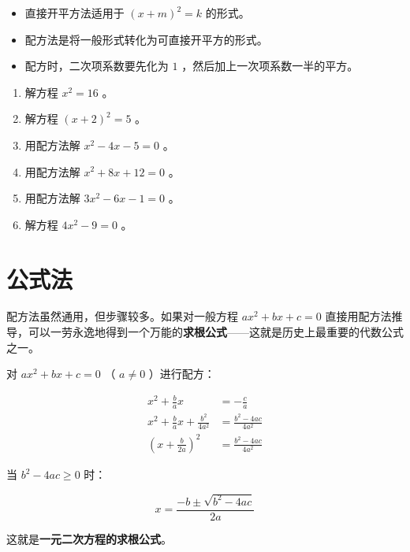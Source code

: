 \begin{keytakeaway}


\begin{itemize}
  \item 直接开平方法适用于 $(x + m)^2 = k$ 的形式。
  \item 配方法是将一般形式转化为可直接开平方的形式。
  \item 配方时，二次项系数要先化为 $1$ ，然后加上一次项系数一半的平方。
\end{itemize}


\end{keytakeaway}

\begin{practice}


\begin{enumerate}
  \item 解方程 $x^2 = 16$ 。
  \item 解方程 $(x + 2)^2 = 5$ 。
  \item 用配方法解 $x^2 - 4x - 5 = 0$ 。
  \item 用配方法解 $x^2 + 8x + 12 = 0$ 。
  \item 用配方法解 $3x^2 - 6x - 1 = 0$ 。
  \item 解方程 $4x^2 - 9 = 0$ 。
\end{enumerate}


\end{practice}

\section*{公式法}


\begin{explore}


配方法虽然通用，但步骤较多。如果对一般方程 $ax^2 + bx + c = 0$ 直接用配方法推导，可以一劳永逸地得到一个万能的\textbf{求根公式}——这就是历史上最重要的代数公式之一。

\end{explore}

\begin{understand}


对 $ax^2 + bx + c = 0$ （ $a \neq 0$ ）进行配方：

\[
\begin{aligned}
x^2 + \frac{b}{a}x &= -\frac{c}{a} \\[4pt]
x^2 + \frac{b}{a}x + \frac{b^2}{4a^2} &= \frac{b^2 - 4ac}{4a^2} \\[4pt]
\left(x + \frac{b}{2a}\right)^2 &= \frac{b^2 - 4ac}{4a^2}
\end{aligned}
\]


当 $b^2 - 4ac \geq 0$ 时：

\[
\boxed{x = \frac{-b \pm \sqrt{b^2 - 4ac}}{2a}}
\]


这就是\textbf{一元二次方程的求根公式}。

\end{understand}

